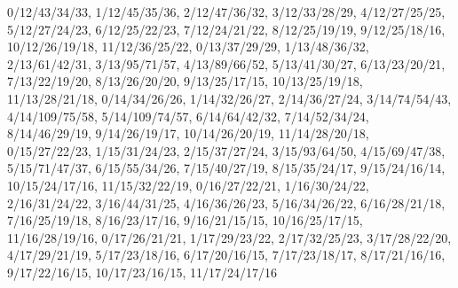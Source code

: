 {  0/12/43/34/33,
  1/12/45/35/36,
  2/12/47/36/32,
  3/12/33/28/29,
  4/12/27/25/25,
  5/12/27/24/23,
  6/12/25/22/23,
  7/12/24/21/22,
  8/12/25/19/19,
  9/12/25/18/16,
  10/12/26/19/18,
  11/12/36/25/22,
  0/13/37/29/29,
  1/13/48/36/32,
  2/13/61/42/31,
  3/13/95/71/57,
  4/13/89/66/52,
  5/13/41/30/27,
  6/13/23/20/21,
  7/13/22/19/20,
  8/13/26/20/20,
  9/13/25/17/15,
  10/13/25/19/18,
  11/13/28/21/18,
  0/14/34/26/26,
  1/14/32/26/27,
  2/14/36/27/24,
  3/14/74/54/43,
  4/14/109/75/58,
  5/14/109/74/57,
  6/14/64/42/32,
  7/14/52/34/24,
  8/14/46/29/19,
  9/14/26/19/17,
  10/14/26/20/19,
  11/14/28/20/18,
  0/15/27/22/23,
  1/15/31/24/23,
  2/15/37/27/24,
  3/15/93/64/50,
  4/15/69/47/38,
  5/15/71/47/37,
  6/15/55/34/26,
  7/15/40/27/19,
  8/15/35/24/17,
  9/15/24/16/14,
  10/15/24/17/16,
  11/15/32/22/19,
  0/16/27/22/21,
  1/16/30/24/22,
  2/16/31/24/22,
  3/16/44/31/25,
  4/16/36/26/23,
  5/16/34/26/22,
  6/16/28/21/18,
  7/16/25/19/18,
  8/16/23/17/16,
  9/16/21/15/15,
  10/16/25/17/15,
  11/16/28/19/16,
  0/17/26/21/21,
  1/17/29/23/22,
  2/17/32/25/23,
  3/17/28/22/20,
  4/17/29/21/19,
  5/17/23/18/16,
  6/17/20/16/15,
  7/17/23/18/17,
  8/17/21/16/16,
  9/17/22/16/15,
  10/17/23/16/15,
  11/17/24/17/16}
\def\monalisaizrez{
  0/0/152/122/101,
  1/0/99/76/62,
  2/0/42/38/42,
  0/1/126/96/79,
  1/1/108/82/68,
  2/1/40/36/41,
  0/2/108/80/67,
  1/2/85/64/55,
  2/2/38/35/42}
